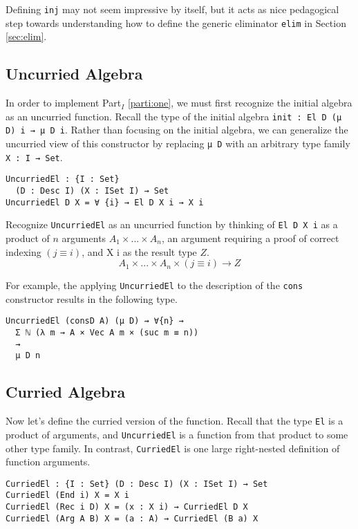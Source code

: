 \documentclass[preprint,nonatbib]{sigplanconf}
\newcommand{\refsec}[1]{Section \ref{sec:#1}}
\newcommand{\refparti}[1]{Part$_I$ \ref{parti:#1}}
\begin{document}
Defining {\tt inj} may not seem impressive by itself, but it acts as
nice pedagogical step towards understanding how to define the generic
eliminator {\tt elim} in \refsec{elim}.

\subsection{Uncurried Algebra}

In order to implement \refparti{one}, we must first recognize the
initial algebra as an uncurried function. Recall the type of the
initial algebra {\tt init : El D (μ D) i → μ D i}. Rather than
focusing on the initial algebra, we can generalize the uncurried view
of this constructor by replacing {\tt μ D} with an arbitrary
type family {\tt X : I → Set}.

\begin{verbatim}
UncurriedEl : {I : Set}
  (D : Desc I) (X : ISet I) → Set
UncurriedEl D X = ∀ {i} → El D X i → X i
\end{verbatim}

Recognize {\tt UncurriedEl} as an uncurried function by thinking of
{\tt El D X i} as a product of $n$ arguments $A_1 × ... × A_n$, an
argument requiring a proof of correct indexing $(j≡i)$, and
X i as the result type $Z$.
\[
A_1 × ... × A_n × (j ≡ i) → Z
\]

For example, the applying {\tt UncurriedEl} to the description of the
{\tt cons} constructor results in the following type.

\begin{verbatim}
UncurriedEl (consD A) (μ D) ⇝ ∀{n} →
  Σ ℕ (λ m → A × Vec A m × (suc m ≡ n))
  →
  μ D n
\end{verbatim}

\subsection{Curried Algebra}

Now let's define the curried version of the function. Recall that the
type {\tt El} is a product of arguments, and {\tt UncurriedEl} is a
function from that product to some other type family. In contrast,
{\tt CurriedEl} is one large right-nested definition of function
arguments.

\begin{verbatim}
CurriedEl : {I : Set} (D : Desc I) (X : ISet I) → Set
CurriedEl (End i) X = X i
CurriedEl (Rec i D) X = (x : X i) → CurriedEl D X
CurriedEl (Arg A B) X = (a : A) → CurriedEl (B a) X
\end{verbatim}
\end{document}
